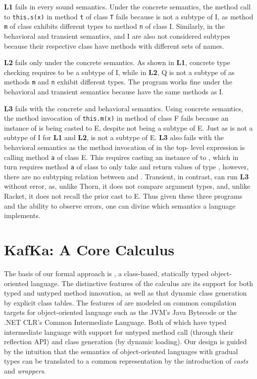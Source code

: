 \documentclass{tex/llncs}
\begin{document}
{\bf L1} fails in every sound semantics. Under the concrete semantics, the
method call to {\tt this.s(x)} in method {\tt t} of class {\tt T} fails
because \A is not a subtype of \xt I, as method {\tt m} of class \A exhibits
different types to method {\tt n} of class \xt I. Similarly, in the behavioral
and transient semantics, \A and \xt I are also not considered subtypes because
their respective class have methods with different sets of names.

{\bf L2} fails only under the concrete semantics. As shown in {\bf L1},
concrete type checking requires \A to be a subtype of \xt I, while in {\bf
L2}, \xt Q is not a subtype of \A as methods {\tt m} and {\tt n} exhibit
different types. The program works fine under the behavioral and transient
semantics because \A have the same methods as \xt I.

{\bf L3} fails with the concrete and behavioral semantics. Using concrete
semantics, the method invocation of {\tt this.m(x)} in method \n of class \xt
F fails because an instance of \C is being casted to \xt E, despite \C not
being a subtype of \xt E.  Just as \A is not a subtype of \xt I for {\bf L1}
and {\bf L2}, \C is not a subtype of \xt E. {\bf L3} also fails with the
behavioral semantics as the method invocation of  in the top-
level expression is calling method \texttt{a} of class \xt E. This requires
casting an instance of \C to \D, which in turn requires method \texttt{a} of
class \C to only take and return values of type \D, however, there are no
subtyping relation between \C and \D. Transient, in contrast, can run {\bf L3}
without error, as, unlike Thorn, it does not compare argument types, and,
unlike Racket, it does not recall the prior cast to \xt E. Thus given these
three programs and the ability to observe errors, one can divine which
semantics a language implements.

\section{KafKa: A Core Calculus}\label{kafkacore}


\vspace{-5mm}

\noindent
The basis of our formal approach is \kafka, a class-based, statically typed
object-oriented language. The distinctive features of the calculus are its
support for both typed and untyped method innovation, as well as that
dynamic class generation by explicit class tables.  The features of \kafka
are modeled on common compilation targets for object-oriented language such
as the JVM's Java Bytecode or the .NET CLR's Common Intermediate
Language. Both of which have typed intermediate language with support for
untyped method call (through their reflection API) and class generation (by
dynamic loading).  Our design is guided by the intuition that the semantics
of object-oriented languages with gradual types can be translated to a
common representation by the introduction of \emph{casts} and
\emph{wrappers}.
\end{document}
